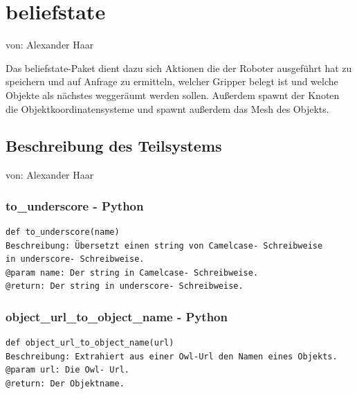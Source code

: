 \documentclass{suturo}
\makeatletter
\newcommand{\chapterauthor}[1]{%
  {\parindent0pt\vspace*{-27pt}%
  \linespread{0}\small\begin{flushright}von: #1\end{flushright}%
  \par\nobreak\vspace*{0pt}}
  \@afterheading%
}
\makeatother
\begin{document}
\section{beliefstate}
\chapterauthor{Alexander Haar}
Das beliefstate-Paket dient dazu sich Aktionen die der Roboter ausgeführt hat zu speichern und auf Anfrage zu ermitteln, welcher Gripper belegt ist und welche Objekte als nächstes weggeräumt werden sollen. Außerdem spawnt der Knoten die Objektkoordinatensysteme und spawnt außerdem das Mesh des Objekts.

\begin{figure}[!htb]
\end{figure}
      
\subsection{Beschreibung des Teilsystems}
\chapterauthor{Alexander Haar}

\subsubsection{to\_underscore - Python}
\begin{verbatim}
def to_underscore(name)
Beschreibung: Übersetzt einen string von Camelcase- Schreibweise 
in underscore- Schreibweise. 
@param name: Der string in Camelcase- Schreibweise.
@return: Der string in underscore- Schreibweise.
\end{verbatim}

\subsubsection{object\_url\_to\_object\_name - Python}
\begin{verbatim}
def object_url_to_object_name(url)
Beschreibung: Extrahiert aus einer Owl-Url den Namen eines Objekts.
@param url: Die Owl- Url.
@return: Der Objektname.
\end{verbatim}
\end{document}
